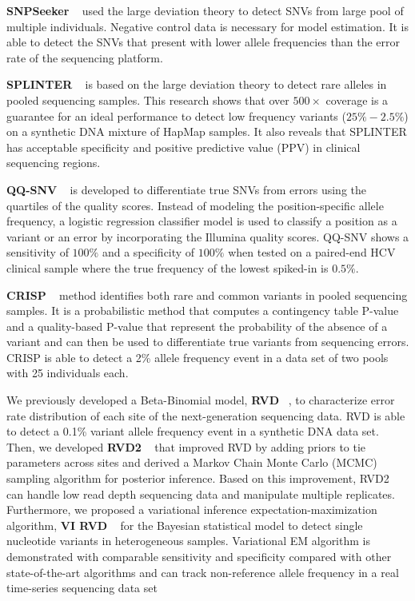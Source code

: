 \documentclass[11pt,reqno]{amsart}
\begin{document}
\textbf{SNPSeeker} ~\citep{Druley2009} used the large deviation theory to detect SNVs from large pool of multiple individuals.
Negative control data is necessary for model estimation.
It is able to detect the SNVs that present with lower allele frequencies than the error rate of the sequencing platform.

\textbf{SPLINTER} ~\citep{Spencer2014} is based on the large deviation theory to detect rare alleles in pooled sequencing samples.
This research shows that over $500 \times$ coverage is a guarantee for an ideal performance to detect low frequency variants ($25\% - 2.5\%$) on a synthetic DNA mixture of HapMap samples.
It also reveals that SPLINTER has acceptable specificity and positive predictive value (PPV) in clinical sequencing regions.

\textbf{QQ-SNV} ~\citep{VanderBorght2015} is developed to differentiate true SNVs from errors using the quartiles of the quality scores.
Instead of modeling the position-specific allele frequency, a logistic regression classifier model is used to classify a position as a variant or an error by incorporating the Illumina quality scores.
QQ-SNV shows a sensitivity of $100\%$ and a specificity of $100\%$ when tested on a paired-end HCV clinical sample where the true frequency of the lowest spiked-in is $0.5\%$.


\textbf{CRISP} ~\citep{Bansal2010} method identifies both rare and common variants in pooled sequencing samples.
It is a probabilistic method that computes a contingency table P-value and a quality-based P-value that represent the probability of the absence of a variant and can then be used to differentiate true variants from sequencing errors.
CRISP is able to detect a 2\% allele frequency event in a data set of two pools with 25 individuals each.


We previously developed a Beta-Binomial model, \textbf{RVD} ~\citep{Flaherty2012}, to characterize error rate distribution of each site of the next-generation sequencing data.
RVD is able to detect a 0.1\% variant allele frequency event in a synthetic DNA data set.
Then, we developed \textbf{RVD2} ~\citep{He2015} that improved RVD by adding priors to tie parameters across sites and derived a Markov Chain Monte Carlo (MCMC) sampling algorithm for posterior inference.
Based on this improvement, RVD2 can handle low read depth sequencing data and manipulate multiple replicates.
Furthermore, we proposed a variational inference expectation-maximization algorithm, \textbf{VI RVD} ~\citep{zhang2016variational} for the Bayesian statistical model to detect single nucleotide variants in heterogeneous samples.
Variational EM algorithm is demonstrated with comparable sensitivity and specificity compared with other state-of-the-art algorithms and can track non-reference allele frequency in a real time-series sequencing data set
\end{document}
